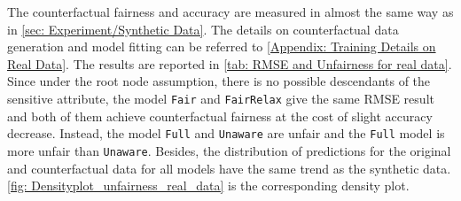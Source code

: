 \documentclass{article}
\begin{document}


The counterfactual fairness and accuracy are measured in almost the same way as in \cref{sec: Experiment/Synthetic Data}. The details on counterfactual data generation and model fitting can be referred to \cref{Appendix: Training Details on Real Data}. The results are reported in \cref{tab: RMSE and Unfairness for real data}. Since under the root node assumption, there is no possible descendants of the sensitive attribute, the model \texttt{Fair} and \texttt{FairRelax} give the same RMSE result and both of them achieve counterfactual fairness at the cost of slight accuracy decrease. Instead, the model \texttt{Full} and \texttt{Unaware} are unfair and the \texttt{Full} model is more unfair than \texttt{Unaware}. Besides, the distribution of predictions for the original and counterfactual data for all models have the same trend as the synthetic data. \cref{fig: Densityplot_unfairness_real_data} is the corresponding density plot.
\end{document}
